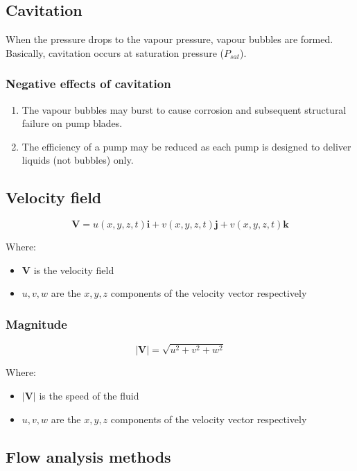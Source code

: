 \documentclass[11pt]{article}
\begin{document}
\subsection{Cavitation}
\label{sec:orga04bccd}
When the pressure drops to the vapour pressure, vapour bubbles are formed. Basically, cavitation occurs at saturation pressure (\(P_{sat}\)).

\subsubsection{Negative effects of cavitation}
\label{sec:org8005d2d}
\begin{enumerate}
\item The vapour bubbles may burst to cause corrosion and subsequent structural failure on pump blades.
\item The efficiency of a pump may be reduced as each pump is designed to deliver liquids (not bubbles) only.
\end{enumerate}

\subsection{Velocity field}
\label{sec:orgb05450b}
\[\boldsymbol{V} = u(x, y, z, t) \boldsymbol{i} + v(x, y, z, t) \boldsymbol{j} + v(x, y, z, t) \boldsymbol{k}\]

Where:
\begin{itemize}
\item \(\boldsymbol{V}\) is the velocity field
\item \(u, v, w\) are the \(x, y, z\) components of the velocity vector respectively
\end{itemize}

\subsubsection{Magnitude}
\label{sec:org0302ec2}
\[\left| \boldsymbol{V} \right| = \sqrt{u^2 + v^2 + w^2}\]

Where:
\begin{itemize}
\item \(\left| \boldsymbol{V} \right|\) is the speed of the fluid
\item \(u, v, w\) are the \(x, y, z\) components of the velocity vector respectively
\end{itemize}

\subsection{Flow analysis methods}
\label{sec:org6f605a6}
\end{document}

